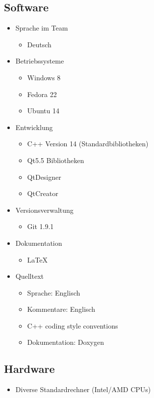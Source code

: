 \subsection{Software}
\begin{itemize}
\item Sprache im Team
	\begin{itemize}[label={--}]
		\item Deutsch
	\end{itemize}
\item Betriebssysteme
	\begin{itemize}[label={--}]
		\item Windows 8
		\item Fedora 22
		\item Ubuntu 14
	\end{itemize}
\item Entwicklung
	\begin{itemize}[label={--}]
		\item C++ Version 14 (Standardbibliotheken)
		\item Qt5.5 Bibliotheken
		\item QtDesigner
		\item QtCreator
	\end{itemize}
\item Versionsverwaltung
	\begin{itemize}[label={--}]
		\item Git 1.9.1
	\end{itemize}
\item Dokumentation
	\begin{itemize}[label={--}]
		\item LaTeX
	\end{itemize}
\item Quelltext
	\begin{itemize}[label={--}]
		\item Sprache: Englisch
		\item Kommentare: Englisch
		\item C++ coding style conventions
		\item Dokumentation: Doxygen
	\end{itemize}
\end{itemize}

\subsection{Hardware}
\begin{itemize}
	\item Diverse Standardrechner (Intel/AMD CPUs)
\end{itemize}
